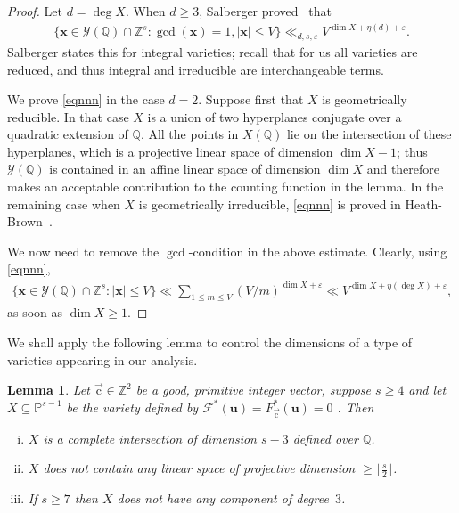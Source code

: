 \documentclass[letterpaper,11pt]{amsart}
\numberwithin{equation}{section}
\newtheorem{lemma}[theorem]{Lemma}
\theoremstyle{definition}
\numberwithin{equation}{section}
\newcommand{\PP}{\mathbb{P}}
\newcommand{\ZZ}{\mathbb{Z}}
\newcommand{\QQ}{\mathbb{Q}}
\newcommand{\x}{\mathbf{x}}
\newcommand{\uu}{\mathbf{u}}
\newcommand{\uc}{{\vec{\mathrm{c}}}}
\def\scrF{{\mathcal F}}
\begin{document}
\begin{proof}
Let \(d=\deg X\).
When \(d\geq 3\), Salberger proved~\cite[Theorem~0.3]{Sal} that
\begin{align}\label{eqnnn}
	\{\x \in \mathcal{Y}(\QQ)\cap\ZZ^{s}:  \gcd(\x)=1, |\x|\leq V \}\ll_{d,s,\varepsilon} V^{\operatorname{dim}X+\eta (d)+\varepsilon}.
	\end{align}
 Salberger states this for integral varieties; recall that for us all varieties are reduced, and thus integral and irreducible are interchangeable terms.
 
 We prove \eqref{eqnnn} in the case  \(d=2\). Suppose first that \(X\) is geometrically reducible. In that case \(X\) is a union of two hyperplanes conjugate over a quadratic extension of \(\QQ\). All the points in \(X(\QQ)\) lie on the intersection of these hyperplanes, which is a projective linear space of dimension \(\dim X-1\); thus \(\mathcal Y(\QQ)\) is contained in an affine linear space of dimension \(\dim X\) and  therefore makes an acceptable contribution to the counting function in the lemma. In the remaining case when \(X\) is geometrically irreducible, \eqref{eqnnn} is proved in Heath-Brown~\cite[Theorem~2]{HeathBrown02}.

  We now need to remove the $\gcd$-condition in the above estimate. Clearly, using \eqref{eqnnn},
 \begin{align*}
  \{\x \in \mathcal{Y}(\QQ)\cap\ZZ^{s}: |\x|\leq V \}\ll \sum_{1\leq m\leq V} (V/m)^{\dim X+\varepsilon}\ll V^{\dim X+\eta (\deg X)+\varepsilon},
 \end{align*}
 as soon as $\dim X\geq 1$. 
\end{proof}
We shall apply the following lemma to control the dimensions of a type of varieties appearing in our analysis. 
 \begin{lemma}\label{lem:intersection-of-dual-varieties}
  	Let \(\uc\in\mathbb{Z}^2\) be a good, primitive integer vector, suppose \(s\geq 4\) and let \(X\subseteq \PP^{s-1}\) be the variety defined by $\scrF^*(\uu)= F^*_\uc(\uu)=0$ . Then
  	\begin{enumerate}[(i)]
  		\item \(X\) is a complete intersection of dimension \(s-3\) defined over \(\QQ\).
  		\item \(X\) does not contain any linear space of projective dimension \(\geq \lfloor\frac{s}{2}\rfloor\).
    \item If \(s \geq 7\) then \(X\) does not have any component of degree~$3$.
  	\end{enumerate}
  \end{lemma}
  
\end{document}
